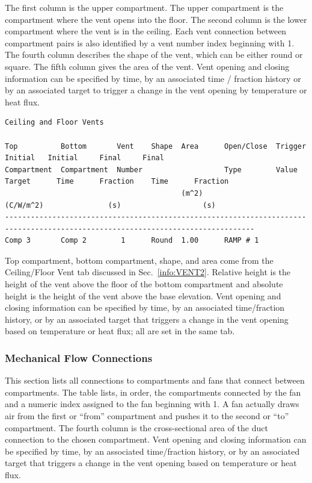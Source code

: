 The first column is the upper compartment.  The upper compartment is the compartment where the vent opens into the floor.  The second column is the lower compartment where the vent is in the ceiling. Each vent connection between compartment pairs is also identified by a vent number index beginning with 1. The fourth column describes the shape of the vent, which can be either round or square.  The fifth column gives the area of the vent. Vent opening and closing information can be specified by time, by an associated time / fraction history or by an associated target to trigger a change in the vent opening by temperature or heat flux.
\newpage
\begin{lstlisting}[basicstyle=\tiny]
Ceiling and Floor Vents

Top          Bottom       Vent    Shape  Area      Open/Close  Trigger                 Initial   Initial     Final     Final
Compartment  Compartment  Number                   Type        Value       Target      Time      Fraction    Time      Fraction
                                         (m^2)                 (C/W/m^2)               (s)                   (s)
--------------------------------------------------------------------------------------------------------------------------------
Comp 3       Comp 2        1      Round  1.00      RAMP # 1
\end{lstlisting}
Top compartment, bottom compartment, shape, and area come from the Ceiling/Floor Vent tab discussed in Sec.~\ref{info:VENT2}. Relative height is the height of the vent above the floor of the bottom compartment and absolute height is the height of the vent above the base elevation.  Vent opening and closing information can be specified by time, by an associated time/fraction history, or by an associated target that triggers a change in the vent opening based on temperature or heat flux; all are set in the same tab.

\subsubsection{Mechanical Flow Connections}

This section lists all connections to compartments and fans that connect between compartments. The table lists, in order, the compartments connected by the fan and a numeric index assigned to the fan beginning with 1.  A fan actually draws air from the first or ``from'' compartment and pushes it to the second or ``to'' compartment. The fourth column is the cross-sectional area of the duct connection to the chosen compartment. Vent opening and closing information can be specified by time, by an associated time/fraction history, or by an associated target that triggers a change in the vent opening based on temperature or heat flux.

